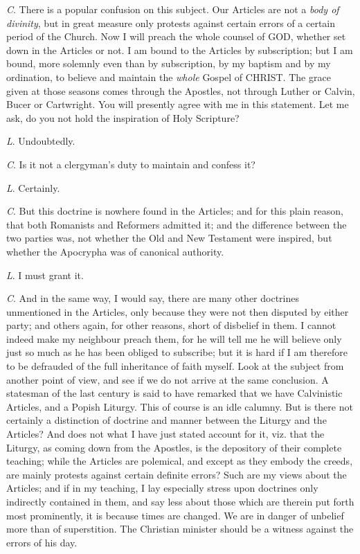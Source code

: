 \emph{C}. There is a popular confusion on this
subject. Our Articles are not a \emph{body of divinity}, but in great
measure only protests against certain errors of a certain period of
the Church. Now I will preach the whole counsel of GOD,
whether set down in the Articles or not. I am bound to the Articles by
subscription; but I am bound, more solemnly even than by subscription,
by my baptism and by my ordination, to believe and maintain the \emph{whole}
Gospel of CHRIST. The grace
given at those seasons comes through the Apostles, not through Luther
or Calvin, Bucer or Cartwright. You will presently agree with me in
this statement. Let me ask, do you not hold the inspiration of Holy
Scripture?

\emph{L}. Undoubtedly.

\emph{C}. Is it not a clergyman's duty to
maintain and confess it?

\emph{L}. Certainly.

\emph{C}. But this doctrine is nowhere found in
the Articles; and for this plain reason, that both Romanists and
Reformers admitted it; and the difference between the two parties was,
not whether the Old and New Testament were inspired, but whether the
Apocrypha was of canonical authority.

\emph{L}. I must grant it.

\emph{C}. And in the same way, I would say, there
are many other doctrines unmentioned in the Articles, only because
they were not then disputed by either party; and others again,
for other reasons, short of disbelief in them. I cannot indeed make my
neighbour preach them, for he will tell me he will believe only just
so much as he has been obliged to subscribe; but it is hard if I am
therefore to be defrauded of the full inheritance of faith myself.
Look at the subject from another point of view, and see if we do not
arrive at the same conclusion. A statesman of the last century is said
to have remarked that we have Calvinistic Articles, and a Popish
Liturgy. This of course is an idle calumny. But is there not certainly
a distinction of doctrine and manner between the Liturgy and the
Articles? And does not what I have just stated account for it, viz.
that the Liturgy, as coming down from the Apostles, is the depository
of their complete teaching; while the Articles are polemical, and
except as they embody the creeds, are mainly protests against certain
definite errors? Such are my views about the Articles; and if in my
teaching, I lay especially stress upon doctrines only indirectly
contained in them, and say less about those which are therein put
forth most prominently, it is because times are changed. We are in
danger of unbelief more than of superstition. The Christian minister
should be a witness against the errors of his day.

